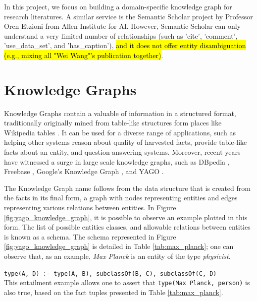 \documentclass[11pt,a4paper,openright]{memoir}
\begin{document}
In this project, we focus on building a domain-specific knowledge graph for research literatures. A similar service is the Semantic Scholar \cite{semanticscholar} project by Professor Oren Etzioni from Allen Institute for AI. However, Semantic Scholar can only understand a very limited number of relationships (such as 'cite', 'comment', 'use\_data\_set', and 'has\_caption'), \hl{and it does not offer entity disambiguation (e.g., mixing all "Wei Wang"'s publication together)}.

\section{Knowledge Graphs}

Knowledge Graphs contain a valuable of information in a structured format, traditionally originally mined from table-like structures form places like Wikipedia \cite{wiki} tables \cite{dbpedia-swj}. It can be used for a diverse range of applications, such as helping other systems reason about quality of harvested facts\cite{Suchanek2007}, provide table-like facts about an entity\cite{google}, and question-answering systems\cite{hixon-clark-hajishirzi-2015}. Moreover, recent years have witnessed a surge in large scale knowledge graphs, such as DBpedia \cite{dbpedia-swj}, Freebase \cite{Bollacker2008}, Google’s Knowledge Graph \cite{google}, and YAGO \cite{Suchanek2007}.

The Knowledge Graph name follows from the data structure that is created from the facts in its final form, a graph with nodes representing entities and edges representing various relations between entities. In Figure \ref{fig:yago_knowledge_graph}, it is possible to observe an example plotted in this form. The list of possible entities classes, and allowable relations between entities is known as a schema. The schema represented in Figure \ref{fig:yago_knowledge_graph} is detailed in Table \ref{tab:max_planck}; one can observe that, as an example, \emph{Max Planck} is an entity of the type \emph{physicist}.

\begin{table}[!htbp]
  \centering
  \RaggedRight
    \texttt{type(A, D) :- type(A, B), subclassOf(B, C), subclassOf(C, D)} \\
  \caption[An example of entailment.]{This entailment example allows one to assert that \texttt{type(Max Planck, person)} is also true, based on the fact tuples presented in Table \ref{tab:max_planck}.}
  \label{tab:entailment_example_max}
\end{table}
\end{document}
